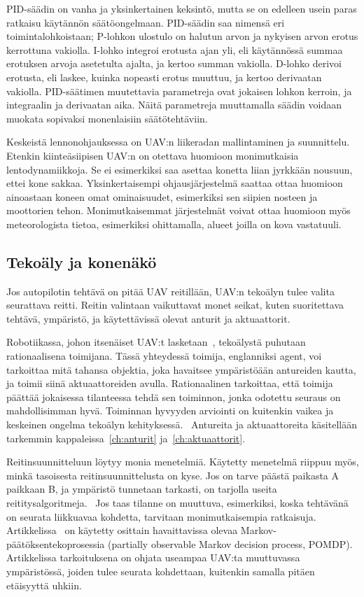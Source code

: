 PID-säädin on vanha ja yksinkertainen keksintö, mutta se on edelleen usein
paras ratkaisu käytännön säätöongelmaan. PID-säädin saa nimensä eri
toimintalohkoistaan; P-lohkon ulostulo on halutun arvon ja nykyisen arvon
erotus kerrottuna vakiolla. I-lohko integroi erotusta ajan yli, eli käytännössä
summaa erotuksen arvoja asetetulta ajalta, ja kertoo summan vakiolla. D-lohko
derivoi erotusta, eli laskee, kuinka nopeasti erotus muuttuu, ja kertoo
derivaatan vakiolla. PID-säätimen muutettavia parametreja ovat jokaisen lohkon
kerroin, ja integraalin ja derivaatan aika. Näitä parametreja muuttamalla
säädin voidaan muokata sopivaksi monenlaisiin
säätötehtäviin.~\cite{Visioli2006}

Keskeistä lennonohjauksessa on UAV:n liikeradan mallintaminen ja suunnittelu.
Etenkin kiinteäsiipisen UAV:n on otettava huomioon monimutkaisia
lentodynamiikkoja. Se ei esimerkiksi saa asettaa konetta liian jyrkkään
nousuun, ettei kone sakkaa. Yksinkertaisempi ohjausjärjestelmä saattaa ottaa
huomioon ainoastaan koneen omat ominaisuudet, esimerkiksi sen siipien nosteen
ja moottorien tehon. Monimutkaisemmat järjestelmät voivat ottaa huomioon myös
meteorologista tietoa, esimerkiksi ohittamalla, alueet joilla on kova
vastatuuli.~\cite{Sebbane2015}

\subsection{Tekoäly ja konenäkö}
Jos autopilotin tehtävä on pitää UAV reitillään, UAV:n tekoälyn tulee valita
seurattava reitti. Reitin valintaan vaikuttavat monet seikat, kuten
suoritettava tehtävä, ympäristö, ja käytettävissä olevat anturit ja
aktuaattorit.

Robotiikassa, johon itsenäiset UAV:t lasketaan~\cite{Sebbane2014}, tekoälystä
puhutaan rationaalisena toimijana. Tässä yhteydessä toimija, englanniksi agent,
voi tarkoittaa mitä tahansa objektia, joka havaitsee ympäristöään antureiden
kautta, ja toimii siinä aktuaattoreiden avulla. Rationaalinen tarkoittaa, että
toimija päättää jokaisessa tilanteessa tehdä sen toiminnon, jonka odotettu
seuraus on mahdollisimman hyvä. Toiminnan hyvyyden arviointi on kuitenkin
vaikea ja keskeinen ongelma tekoälyn kehityksessä.~\cite{Russell2013}
Antureita ja aktuaattoreita käsitellään tarkemmin kappaleissa~\ref{ch:anturit}
ja~\ref{ch:aktuaattorit}.

Reitinsuunnitteluun löytyy monia menetelmiä. Käytetty menetelmä riippuu myös,
minkä tasoisesta reitinsuunnittelusta on kyse. Jos on tarve päästä paikasta A
paikkaan B, ja ympäristö tunnetaan tarkasti, on tarjolla useita
reititysalgoritmeja.~\cite{Sebbane2014} Jos taas tilanne on muuttuva,
esimerkiksi, koska tehtävänä on seurata liikkuavaa kohdetta, tarvitaan
monimutkaisempia ratkaisuja. Artikkelissa~\cite{Ragi2013} on käytetty 
osittain havaittavissa olevaa Markov-päätöksentekoprosessia (partially
observable Markov decision process, POMDP).
Artikkelissa tarkoituksena on ohjata useampaa UAV:ta muuttuvassa ympäristössä,
joiden tulee seurata kohdettaan, kuitenkin samalla pitäen etäisyyttä uhkiin.

